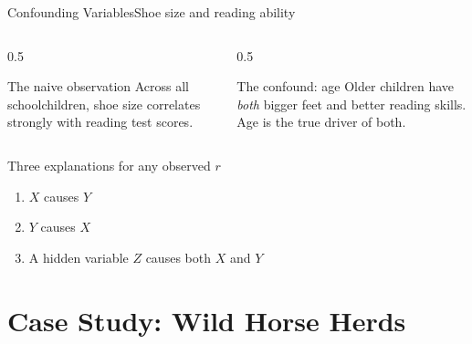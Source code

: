 \documentclass[aspectratio=169,11pt]{beamer}
\begin{document}
\begin{frame}{Confounding Variables}{Shoe size and reading ability}
  \begin{columns}[T]
    \begin{column}{0.5\textwidth}
      \begin{alertblock}{The naive observation}
        \small Across all schoolchildren, shoe size correlates strongly with
        reading test scores.
      \end{alertblock}
    \end{column}
    \begin{column}{0.5\textwidth}
      \begin{exampleblock}{The confound: age}
        \small Older children have \emph{both} bigger feet and better
        reading skills. Age is the true driver of both.
      \end{exampleblock}
    \end{column}
  \end{columns}
  \vfill
  \begin{block}{Three explanations for any observed $r$}
    \small
    \begin{enumerate}
      \item $X$ causes $Y$
      \item $Y$ causes $X$
      \item A hidden variable $Z$ causes both $X$ and $Y$
    \end{enumerate}
  \end{block}
\end{frame}

\section{Case Study: Wild Horse Herds}
\end{document}
